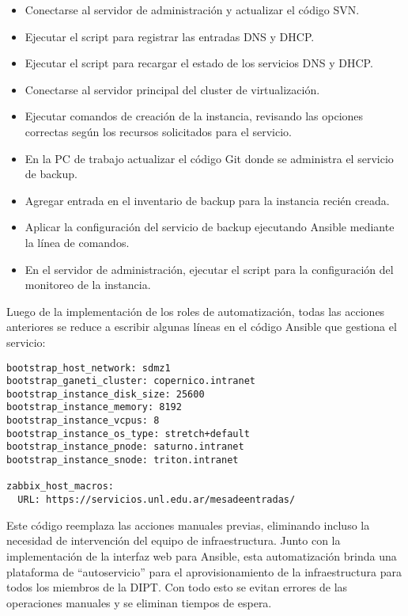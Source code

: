 \begin{itemize}
\item Conectarse al servidor de administración y actualizar el código
  SVN.
\item Ejecutar el script para registrar las entradas DNS y DHCP.
\item Ejecutar el script para recargar el estado de los servicios DNS
  y DHCP.
\item Conectarse al servidor principal del cluster de virtualización.
\item Ejecutar comandos de creación de la instancia, revisando las
  opciones correctas según los recursos solicitados para el servicio.
\item En la PC de trabajo actualizar el código Git donde se administra
  el servicio de backup.
\item Agregar entrada en el inventario de backup para la instancia
  recién creada.
\item Aplicar la configuración del servicio de backup ejecutando
  Ansible mediante la línea de comandos.
\item En el servidor de administración, ejecutar el script para la
  configuración del monitoreo de la instancia.
\end{itemize}
Luego de la implementación de los roles de automatización, todas las
acciones anteriores se reduce a escribir algunas líneas en el código
Ansible que gestiona el servicio:

\iflatexml\else
{}
\fi
\begin{Verbatim}
bootstrap_host_network: sdmz1
bootstrap_ganeti_cluster: copernico.intranet
bootstrap_instance_disk_size: 25600
bootstrap_instance_memory: 8192
bootstrap_instance_vcpus: 8
bootstrap_instance_os_type: stretch+default
bootstrap_instance_pnode: saturno.intranet
bootstrap_instance_snode: triton.intranet

zabbix_host_macros:
  URL: https://servicios.unl.edu.ar/mesadeentradas/
\end{Verbatim}

Este código reemplaza las acciones manuales previas, eliminando
incluso la necesidad de intervención del equipo de
infraestructura. Junto con la implementación de la interfaz web para
Ansible, esta automatización brinda una plataforma de ``autoservicio''
para el aprovisionamiento de la infraestructura para todos los
miembros de la DIPT. Con todo esto se evitan errores de las
operaciones manuales y se eliminan tiempos de espera.

